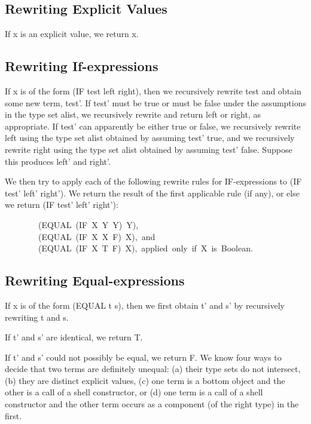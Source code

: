 \documentclass[11pt]{book}
\newenvironment{pubasis}{\begin{flushleft}\ttfamily\small}{\normalsize\rmfamily\end{flushleft}}
\newcommand{\pubdefaulttextsize}{\large}
\begin{document}
\subsection{Rewriting Explicit Values}
\pubdefaulttextsize
If x is an explicit value, we return x.
\subsection{Rewriting If-expressions}
\pubdefaulttextsize
If x is of the form (IF test left right), then we recursively rewrite
test and obtain some new term, test'.  If test' must be true or must
be false under the assumptions in the type set alist, we recursively rewrite and return left or right, as appropriate.
If test' can apparently be either true or false,
we recursively rewrite left using the type set alist obtained
by assuming test'
true, and we recursively rewrite right using the type set alist obtained
by assuming test'
false.  Suppose this produces left' and right'.

We then try to apply each of the following rewrite rules for IF-expressions
to (IF test' left' right').  We return the result of the first applicable
rule (if any), or else we return  (IF test' left' right'):
\begin{pubasis}
~~~~~~~~(EQUAL~(IF~X~Y~Y)~Y),\\

~~~~~~~~(EQUAL~(IF~X~X~F)~X),~and\\

~~~~~~~~(EQUAL~(IF~X~T~F)~X),~applied~only~if~X~is~Boolean.\\
\end{pubasis}
\subsection{Rewriting Equal-expressions}
\pubdefaulttextsize
If x is of the form (EQUAL t s), then we first obtain t' and s' by recursively
rewriting t and s.

If t' and s' are identical,
we return T.

If t' and s' could not possibly be equal, we return F.
We know four ways to decide that two terms are definitely unequal:
(a) their type sets do not intersect, (b) they are distinct
explicit values, (c) one term is a bottom object and the other is
a call of a shell constructor, or (d) one term is a call of a shell constructor and
the other term occurs as a component (of the right type) in the first.
\end{document}
